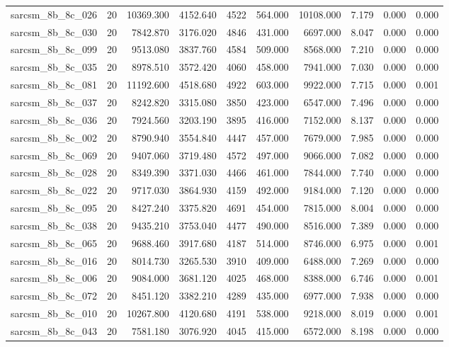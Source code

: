 \begin{tabular}{lrrrrrrrrr}
sarcsm\_8b\_8c\_026 & 20 & 10369.300 & 4152.640 & 4522 & 564.000 & 10108.000 & 7.179 & 0.000 & 0.000 \\
sarcsm\_8b\_8c\_030 & 20 & 7842.870 & 3176.020 & 4846 & 431.000 & 6697.000 & 8.047 & 0.000 & 0.000 \\
sarcsm\_8b\_8c\_099 & 20 & 9513.080 & 3837.760 & 4584 & 509.000 & 8568.000 & 7.210 & 0.000 & 0.000 \\
sarcsm\_8b\_8c\_035 & 20 & 8978.510 & 3572.420 & 4060 & 458.000 & 7941.000 & 7.030 & 0.000 & 0.000 \\
sarcsm\_8b\_8c\_081 & 20 & 11192.600 & 4518.680 & 4922 & 603.000 & 9922.000 & 7.715 & 0.000 & 0.001 \\
sarcsm\_8b\_8c\_037 & 20 & 8242.820 & 3315.080 & 3850 & 423.000 & 6547.000 & 7.496 & 0.000 & 0.000 \\
sarcsm\_8b\_8c\_036 & 20 & 7924.560 & 3203.190 & 3895 & 416.000 & 7152.000 & 8.137 & 0.000 & 0.000 \\
sarcsm\_8b\_8c\_002 & 20 & 8790.940 & 3554.840 & 4447 & 457.000 & 7679.000 & 7.985 & 0.000 & 0.000 \\
sarcsm\_8b\_8c\_069 & 20 & 9407.060 & 3719.480 & 4572 & 497.000 & 9066.000 & 7.082 & 0.000 & 0.000 \\
sarcsm\_8b\_8c\_028 & 20 & 8349.390 & 3371.030 & 4466 & 461.000 & 7844.000 & 7.740 & 0.000 & 0.000 \\
sarcsm\_8b\_8c\_022 & 20 & 9717.030 & 3864.930 & 4159 & 492.000 & 9184.000 & 7.120 & 0.000 & 0.000 \\
sarcsm\_8b\_8c\_095 & 20 & 8427.240 & 3375.820 & 4691 & 454.000 & 7815.000 & 8.004 & 0.000 & 0.000 \\
sarcsm\_8b\_8c\_038 & 20 & 9435.210 & 3753.040 & 4477 & 490.000 & 8516.000 & 7.389 & 0.000 & 0.000 \\
sarcsm\_8b\_8c\_065 & 20 & 9688.460 & 3917.680 & 4187 & 514.000 & 8746.000 & 6.975 & 0.000 & 0.001 \\
sarcsm\_8b\_8c\_016 & 20 & 8014.730 & 3265.530 & 3910 & 409.000 & 6488.000 & 7.269 & 0.000 & 0.000 \\
sarcsm\_8b\_8c\_006 & 20 & 9084.000 & 3681.120 & 4025 & 468.000 & 8388.000 & 6.746 & 0.000 & 0.001 \\
sarcsm\_8b\_8c\_072 & 20 & 8451.120 & 3382.210 & 4289 & 435.000 & 6977.000 & 7.938 & 0.000 & 0.000 \\
sarcsm\_8b\_8c\_010 & 20 & 10267.800 & 4120.680 & 4191 & 538.000 & 9218.000 & 8.019 & 0.000 & 0.001 \\
sarcsm\_8b\_8c\_043 & 20 & 7581.180 & 3076.920 & 4045 & 415.000 & 6572.000 & 8.198 & 0.000 & 0.000 \\

\end{tabular}

